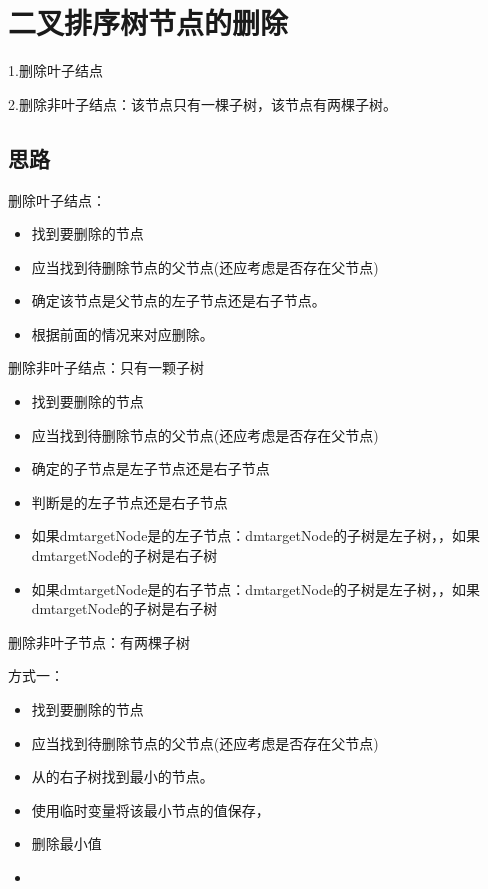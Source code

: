 \documentclass[a4paper]{report}
\begin{document}
\section{二叉排序树节点的删除}
1.删除叶子结点

2.删除非叶子结点：该节点只有一棵子树，该节点有两棵子树。

\subsection{思路}
删除叶子结点：
\begin{itemize}
  \item 找到要删除的节点
  \item 应当找到待删除节点的父节点(还应考虑是否存在父节点)
  \item 确定该节点是父节点的左子节点还是右子节点。
  \item 根据前面的情况来对应删除。
\end{itemize}

删除非叶子结点：只有一颗子树
\begin{itemize}
  \item 找到要删除的节点
  \item 应当找到待删除节点的父节点(还应考虑是否存在父节点)
  \item 确定的子节点是左子节点还是右子节点
  \item 判断是的左子节点还是右子节点
  \item 如果dm{targetNode}是的左子节点：dm{targetNode}的子树是左子树，，如果dm{targetNode}的子树是右子树
  \item 如果dm{targetNode}是的右子节点：dm{targetNode}的子树是左子树，，如果dm{targetNode}的子树是右子树
\end{itemize}

删除非叶子节点：有两棵子树

方式一：
\begin{itemize}
  \item 找到要删除的节点
  \item 应当找到待删除节点的父节点(还应考虑是否存在父节点)
 \item 从的\textcolor[rgb]{1.00,0.00,0.00}{右子树}找到\textcolor[rgb]{1.00,0.00,0.00}{最小}的节点。
 \item 使用临时变量将该最小节点的值保存，
 \item 删除最小值
 \item {}
\end{itemize}
\end{document}
